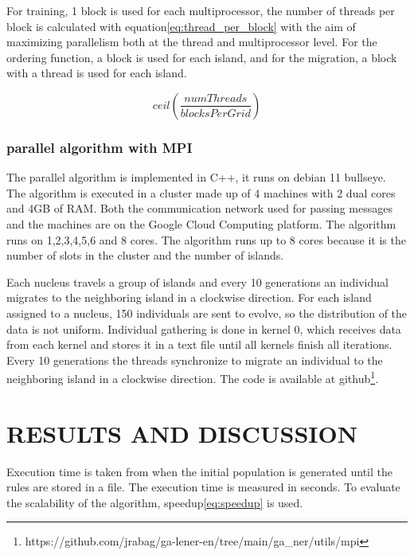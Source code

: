\documentclass{IEEEtran}
\begin{document}
For training, 1 block is used for each multiprocessor, the number of threads per block is calculated with equation\ref{eq:thread_per_block} with the aim of maximizing parallelism both at the thread and multiprocessor level. For the ordering function, a block is used for each island, and for the migration, a block with a thread is used for each island.

\begin{equation}
  \label{eq:thread_per_block}
  ceil(\frac{numThreads}{blocksPerGrid})
\end{equation}


\subsubsection{parallel algorithm with MPI}

The parallel algorithm is implemented in C++, it runs on debian 11 bullseye. The algorithm is executed in a cluster made up of 4 machines with 2 dual cores and 4GB of RAM. Both the communication network used for passing messages and the machines are on the Google Cloud Computing platform. The algorithm runs on 1,2,3,4,5,6 and 8 cores. The algorithm runs up to 8 cores because it is the number of slots in the cluster and the number of islands.

Each nucleus travels a group of islands and every 10 generations an individual migrates to the neighboring island in a clockwise direction. For each island assigned to a nucleus, 150 individuals are sent to evolve, so the distribution of the data is not uniform. Individual gathering is done in kernel 0, which receives data from each kernel and stores it in a text file until all kernels finish all iterations. Every 10 generations the threads synchronize to migrate an individual to the neighboring island in a clockwise direction. The code is available at github\footnote{https://github.com/jrabag/ga\--lener\--en/tree/main/ga\_ner/utils/mpi}.


\section{RESULTS AND DISCUSSION}


Execution time is taken from when the initial population is generated until the rules are stored in a file. The execution time is measured in seconds. To evaluate the scalability of the algorithm, speedup\ref{eq:speedup} is used.
\end{document}
